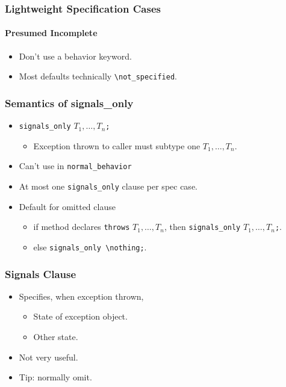 \begin{frame}[fragile]
\frametitle{Lightweight Specification Cases}
\framesubtitle{Presumed Incomplete}

\begin{itemize}
\item
Don't use a behavior keyword.

\item
Most defaults technically \lstinline!\not_specified!.
\end{itemize}
\end{frame}

\begin{frame}[fragile]
\frametitle{Semantics of signals\_only}

\begin{itemize}
\item
\lstinline!signals_only! $T_1, \ldots, T_n$\texttt{;}
\begin{itemize}
\item
Exception thrown to caller must subtype
one $T_1, \ldots, T_n$.
\end{itemize}

\item
Can't use in \lstinline!normal_behavior!

\item
At most one \lstinline!signals_only! clause per spec case.

\item
Default for omitted clause
\begin{itemize}
\item
if method declares \lstinline!throws! $T_1, \ldots, T_n$,
\newline
then \lstinline!signals_only! $T_1, \ldots, T_n$\texttt{;}.

\item
else \lstinline!signals_only \nothing;!.
\end{itemize}
\end{itemize}
\end{frame}

\begin{frame}
\frametitle{Signals Clause}

\begin{itemize}
\item
Specifies, when exception thrown,
\begin{itemize}
\item
State of exception object.

\item
Other state.
\end{itemize}

\item
Not very useful.

\item
Tip: normally omit.
\end{itemize}
\end{frame}

